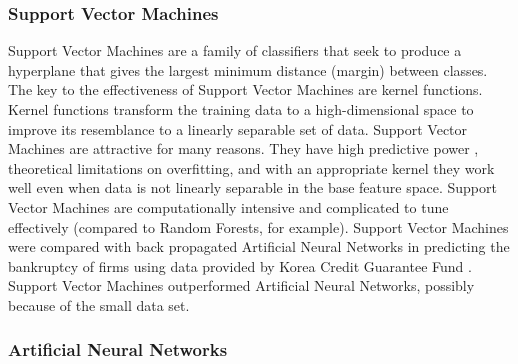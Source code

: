 \documentclass[../thesis/thesis.tex]{subfiles}
\begin{document}
\subsubsection{Support Vector Machines}

Support Vector Machines are a family of classifiers that seek to produce a hyperplane that gives the largest minimum distance (margin) between classes. The key to the effectiveness of Support Vector Machines are kernel functions. Kernel functions transform the training data to a high-dimensional space to improve its resemblance to a linearly separable set of data. Support Vector Machines are attractive for many reasons. They have high predictive power \cite{caruana2006}, theoretical limitations on overfitting, and with an appropriate kernel they work well even when data is not linearly separable in the base feature space. Support Vector Machines are computationally intensive and complicated to tune effectively (compared to Random Forests, for example). Support Vector Machines were compared with back propagated Artificial Neural Networks in predicting the bankruptcy of firms using data provided by Korea Credit Guarantee Fund \cite{shin2005}. Support Vector Machines outperformed Artificial Neural Networks, possibly because of the small data set.

\subsubsection{Artificial Neural Networks}
\end{document}
